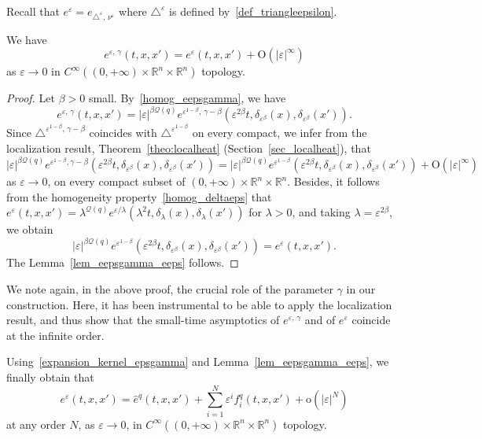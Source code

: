 \documentclass[AHL,Unicode,published]{cedram}
\newcommand*\R{\mathbb{R}}
\newcommand{\calQ}{\mathcal{Q}}
\newcommand{\rmo}{\mathrm{o}}
\newcommand{\rmO}{\mathrm{O}}
\begin{document}
Recall that $e^\varepsilon = e_{\triangle^\varepsilon,\,\nu^\varepsilon}$ where $\triangle^\varepsilon$ is defined by~\eqref{def_triangleepsilon}.

\begin{lemm}\label{lem_eepsgamma_eeps}
We have
\[
e^{\varepsilon,\,\gamma}(t,x,x') = e^\varepsilon(t,x,x') + \rmO(\vert\varepsilon\vert^\infty)
\]
as $\varepsilon\rightarrow 0$ in $C^\infty((0,+\infty)\times\R^n\times\R^n)$ topology.
\end{lemm}

\begin{proof}
Let $\beta>0$ small. By~\eqref{homog_eepsgamma}, we have
\[
e^{\varepsilon,\,\gamma}(t,x,x') = \vert\varepsilon\vert^{\beta\calQ(q)} e^{\varepsilon^{1-\beta},\,\gamma-\beta} \left(\varepsilon^{2\beta} t, \delta_{\varepsilon^\beta}(x), \delta_{\varepsilon^\beta}(x')\right).
\]
Since $\triangle^{\varepsilon^{1-\beta},\,\gamma-\beta}$ coincides with $\triangle^{\varepsilon^{1-\beta}}$ on every compact, we infer from the localization result, Theorem~\ref{theo:localheat} (Section~\ref{sec_localheat}), that
\[
\vert\varepsilon\vert^{\beta\calQ(q)} e^{\varepsilon^{1-\beta},\gamma-\beta} \left(\varepsilon^{2\beta} t, \delta_{\varepsilon^\beta}(x), \delta_{\varepsilon^\beta}(x')\right) = \vert\varepsilon\vert^{\beta\calQ(q)} e^{\varepsilon^{1-\beta}}\left(\varepsilon^{2\beta} t, \delta_{\varepsilon^\beta}(x), \delta_{\varepsilon^\beta}(x')\right) + \rmO(\vert\varepsilon\vert^\infty)
\]
as $\varepsilon\rightarrow 0$, on every compact subset of $(0,+\infty)\times\R^n\times\R^n$. Besides, it follows from the homogeneity property~\eqref{homog_deltaeps} that $e^\varepsilon(t,x,x') = \lambda^{\calQ(q)} e^{\varepsilon/\lambda}(\lambda^2 t,\delta_\lambda(x),\delta_\lambda(x'))$ for $\lambda>0$, and taking $\lambda=\varepsilon^{2\beta}$, we obtain
\[
\vert\varepsilon\vert^{\beta\calQ(q)} e^{\varepsilon^{1-\beta}}\left(\varepsilon^{2\beta} t, \delta_{\varepsilon^\beta}(x), \delta_{\varepsilon^\beta}(x')\right) = e^\varepsilon(t,x,x').
\]
The Lemma~\ref{lem_eepsgamma_eeps} follows.
\end{proof}

We note again, in the above proof, the crucial role of the parameter $\gamma$ in our construction. Here, it has been instrumental to be able to apply the localization result, and thus show that the small-time asymptotics of $e^{\varepsilon,\,\gamma}$ and of $e^\varepsilon$ coincide at the infinite order.

Using~\eqref{expansion_kernel_epsgamma} and Lemma~\ref{lem_eepsgamma_eeps}, we finally obtain that
\[
e^\varepsilon(t,x,x') = \widehat{e}^{q}(t,x,x') + \sum_{i=1}^N \varepsilon^i f_i^{q}(t,x,x') +\rmo\left(\vert\varepsilon\vert^N\right)
\]
at any order $N$, as $\varepsilon\rightarrow 0$, in $C^\infty((0,+\infty)\times\R^n\times\R^n)$ topology.
\end{document}

